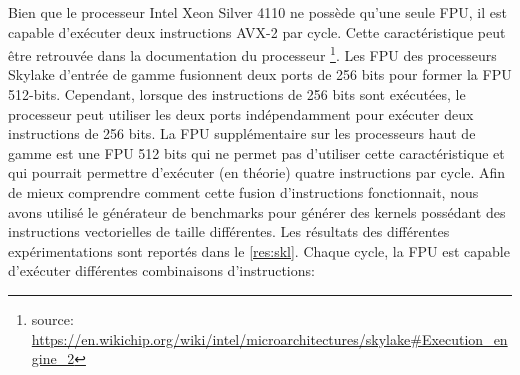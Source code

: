        
        
        
        \begin{table}[h!]
        \centering

        \caption{Mesure de la performance de processeur de deux gammes différentes à l'aide du \texttt{Kernel Generator} et de la commange suivante: \texttt{/kg  -P double -W 256 -O ffffffff}. Alors que le processeur de la gamme Gold possède une FPU de plus, il obtient des performances similaires à celles du processeur de gamme Silver.}
        \label{table:skl_bench2}
        \end{table}
        
        Bien que le processeur Intel Xeon Silver 4110 ne possède qu'une seule FPU, il est capable d'exécuter deux instructions AVX-2 par cycle. Cette caractéristique peut être retrouvée dans la documentation du processeur \footnote{source: \url{https://en.wikichip.org/wiki/intel/microarchitectures/skylake\#Execution_engine_2}}. Les FPU des processeurs Skylake d'entrée de gamme fusionnent deux ports de 256 bits pour former la FPU 512-bits. Cependant, lorsque des instructions de 256 bits sont exécutées, le processeur peut utiliser les deux ports indépendamment pour exécuter deux instructions de 256 bits. La FPU supplémentaire sur les processeurs haut de gamme est une FPU 512 bits qui ne permet pas d'utiliser cette caractéristique et qui pourrait permettre d'exécuter (en théorie) quatre instructions par cycle.
        Afin de mieux comprendre comment cette fusion d'instructions fonctionnait, nous avons utilisé le générateur de benchmarks pour générer des \glspl{kernel} possédant des instructions vectorielles de taille différentes. Les résultats des différentes expérimentations sont reportés dans le \autoref{res:skl}. Chaque cycle, la FPU est capable d'exécuter différentes combinaisons d'instructions: 


